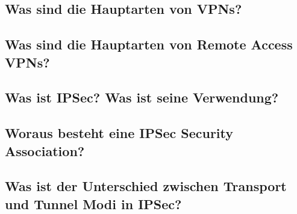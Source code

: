 \subsection*{Was sind die Hauptarten von VPNs?}
\subsection*{Was sind die Hauptarten von Remote Access VPNs?}
\subsection*{Was ist IPSec? Was ist seine Verwendung?}
\subsection*{Woraus besteht eine IPSec Security Association?}
\subsection*{Was ist der Unterschied zwischen Transport und Tunnel Modi in IPSec?}
